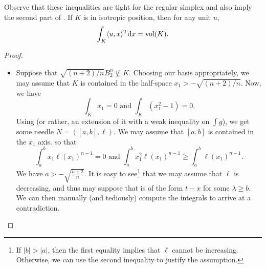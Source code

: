 Observe that these inequalities are tight for the regular simplex and also imply the second part of . If $K$ is in isotropic position, then for any unit $u$,
\[ \int_K \langle u,x\rangle^2 \operatorname{d}\!{x} = \operatorname{vol}(K). \]

\begin{proof}
	\phantom{agh}
	\begin{itemize}
		\item Suppose that $\sqrt{(n+2)/n}B_2^n\not\subseteq K$. Choosing our basis appropriately, we may assume that $K$ is contained in the half-space $x_1 > -\sqrt{(n+2)/n}$. Now, we have
		\[ \int_K x_1 = 0 \text{ and } \int_K (x_1^2 - 1) = 0. \]
		Using  (or rather, an extension of it with a weak inequality on $\int g$), we get some needle $N=([a,b],\ell)$. We may assume that $[a,b]$ is contained in the $x_1$ axis. so that
		\[ \int_a^b x_1\ell(x_1)^{n-1} = 0 \text{ and } \int_a^b x_1^2\ell(x_1)^{n-1} \geq \int_a^b \ell(x_1)^{n-1}. \]
		We have $a > -\sqrt{\frac{n+2}{n}}$. It is easy to see\footnote{If $|b|>|a|$, then the first equality implies that $\ell$ cannot be increasing. Otherwise, we can use the second inequality to justify the assumption.} that we may assume that $\ell$ is decreasing, and thus may suppose that is of the form $t-x$ for some $\lambda\geq b$. We can then manually (and tediously) compute the integrals to arrive at a contradiction.


\end{itemize}
\end{proof}
